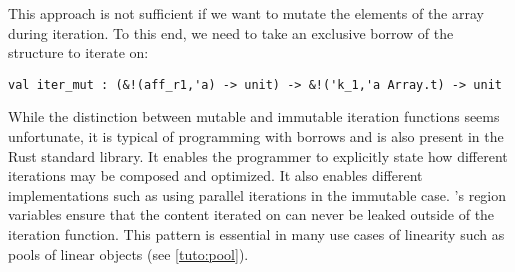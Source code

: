 This approach is not sufficient if we want to mutate the elements of
the array during iteration.
To this end, we need to take an exclusive borrow of the structure to iterate
on:
\begin{lstlisting}[numbers=none]
val iter_mut : (&!(aff_r1,'a) -> unit) -> &!('k_1,'a Array.t) -> unit
\end{lstlisting}

While the distinction between mutable and immutable iteration functions
seems unfortunate, it is typical of
programming with borrows and is also present in the Rust standard library.
It enables the programmer to explicitly state how different iterations
may be composed and optimized.
It also enables different implementations such as
using parallel iterations in the immutable case.
\lang's region variables ensure that the content iterated on can never
be leaked outside of the iteration function.
This pattern is essential in many use cases of linearity such
as pools of linear objects (see \cref{tuto:pool}).

